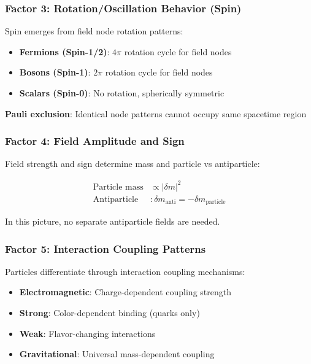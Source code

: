 	\subsubsection{Factor 3: Rotation/Oscillation Behavior (Spin)}
	\label{subsubsec:spin_behavior}
	
	Spin emerges from field node rotation patterns:
	
	\begin{tcolorbox}[colback=green!5!white,colframe=green!75!black,title=Spin from Field Node Rotation]
		\begin{itemize}
			\item \textbf{Fermions (Spin-1/2)}: $4\pi$ rotation cycle for field nodes
			\item \textbf{Bosons (Spin-1)}: $2\pi$ rotation cycle for field nodes
			\item \textbf{Scalars (Spin-0)}: No rotation, spherically symmetric
		\end{itemize}
		
		\textbf{Pauli exclusion}: Identical node patterns cannot occupy same spacetime region
	\end{tcolorbox}
	
	\subsubsection{Factor 4: Field Amplitude and Sign}
	\label{subsubsec:field_amplitude}
	
	Field strength and sign determine mass and particle vs antiparticle:
	
	\begin{align}
		\text{Particle mass} &\propto |\delta m|^2 \\
		\text{Antiparticle} &: \delta m_{\text{anti}} = -\delta m_{\text{particle}}
	\end{align}
	
	In this picture, no separate antiparticle fields are needed.
	
	\subsubsection{Factor 5: Interaction Coupling Patterns}
	\label{subsubsec:coupling_patterns}
	
	Particles differentiate through interaction coupling mechanisms:
	\begin{itemize}
		\item \textbf{Electromagnetic}: Charge-dependent coupling strength
		\item \textbf{Strong}: Color-dependent binding (quarks only)
		\item \textbf{Weak}: Flavor-changing interactions
		\item \textbf{Gravitational}: Universal mass-dependent coupling
	\end{itemize}
	
